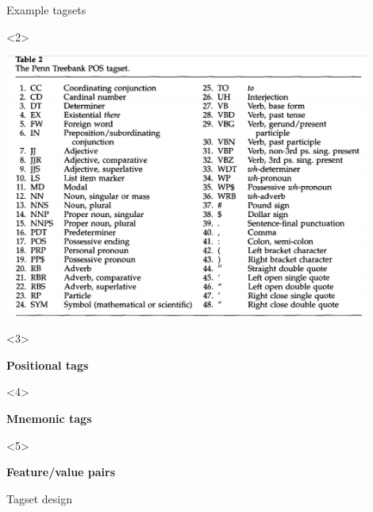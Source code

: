 \documentclass{beamer}
\begin{document}
\begin{frame}{Example tagsets}
\begin{onlyenv}<2>
  \begin{center}
  \includegraphics[width=0.9\textwidth]{images/penn-tagset.png}
  \end{center}
\end{onlyenv}

\begin{onlyenv}<3>
\begin{center}
\textbf{Positional tags} 
\end{center}

\end{onlyenv}

\begin{onlyenv}<4>
\begin{center}
\textbf{Mnemonic tags} 
\end{center}

\end{onlyenv}

\begin{onlyenv}<5>
\begin{center}
\textbf{Feature/value pairs} 
\end{center}

\end{onlyenv}

\end{frame}


\begin{frame}{Tagset design}

% 

\end{frame}
\end{document}
